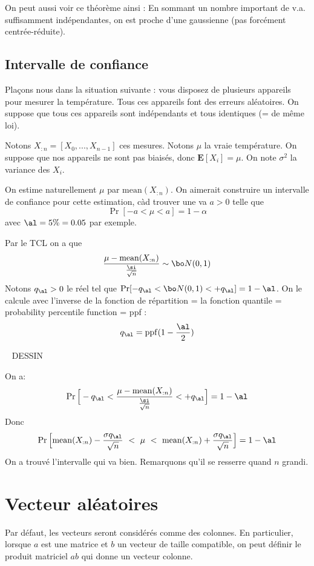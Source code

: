 \documentclass{article}
\def\dessin{\ \linebreak \vspace{0.5cm}  \linebreak  DESSIN  \vspace{1cm} \ \linebreak   }
\def\mean{\mathrm{mean}}
\begin{document}
On peut aussi voir ce théorème ainsi : En sommant un nombre important de v.a. suffisamment indépendantes, on est proche d'une gaussienne (pas forcément centrée-réduite). 



\subsection{Intervalle de confiance}

Plaçons nous dans la situation suivante : vous disposez de plusieurs appareils pour mesurer la température. Tous ces appareils font des erreurs aléatoires. On suppose que tous ces appareils sont indépendants et tous identiques (= de même loi).


Notons $X_{:n}=[X_0,...,X_{n-1}]$ ces mesures. Notons $\mu$ la vraie température. On suppose que nos appareils ne sont pas biaisés, donc $\mathbf E[X_i]=\mu$. On note $\sigma^2$ la variance des $X_i$.

 On  estime naturellement $\mu$ par $\mean(X_{:n})$. On aimerait construire un intervalle de confiance pour cette estimation, càd trouver une va $a>0$ telle que
$$
\Pr[   -a<\mu<a  ] =  1-\alpha
$$
avec $\al=5\%=0.05$ par exemple.  


Par le TCL on a que 
$$
\frac {\mu- \mathrm{mean}(X_{:n})}{\frac {\si}{\sqrt{n}}}   \sim \bo N(0,1)
$$
Notons $q_\al>0$  le réel tel que $\Pr[ -q_\al < \bo N(0,1) <+q_\al  ] = 1-\al$. On le calcule avec l'inverse de la fonction de répartition = la fonction quantile = probability percentile function = ppf :
$$
q_\al = \mathrm{ppf}(1 - \frac \al 2)
$$

\dessin

On a:
$$
\Pr\Big[  - q_\al <  \frac {\mu- \mathrm{mean}(X_{:n})}{\frac {\si}{\sqrt{n}}}   <  + q_\al   \Big]  = 1-\al
$$
Donc
$$
\Pr\Big[     \mathrm{mean} (X_{:n}) - \frac {\sigma q_\al }{\sqrt{n}} \  < \ \mu \  < \   \mathrm{mean} (X_{:n}) +  \frac {\sigma q_\al }{\sqrt{n}}   \Big]  = 1-\al
$$
On a trouvé l'intervalle qui va bien. Remarquons qu'il se resserre quand $n$ grandi.



\section{Vecteur aléatoires}

Par défaut, les vecteurs seront considérés comme des colonnes. En particulier, lorsque $a$ est une matrice et $b$ un vecteur de taille compatible, on peut définir le produit matriciel   $ab$ qui donne un vecteur colonne.    
\end{document}
